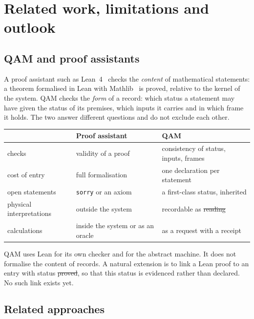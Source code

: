 \section{Related work, limitations and outlook}\label{sec:related}

\subsection{QAM and proof assistants}

A proof assistant such as Lean~4~\cite{lean4} checks the \emph{content} of mathematical statements: a theorem formalised in Lean with
Mathlib~\cite{mathlib} is proved, relative to the kernel of the system. QAM checks the \emph{form} of a record: which status a statement
may have given the status of its premises, which inputs it carries and in which frame it holds. The two answer different questions and do
not exclude each other.
\begin{center}
\small
\begin{tabular}{@{}p{}p{}p{}@{}}
\toprule
 & Proof assistant & QAM\\
\midrule
checks & validity of a proof & consistency of status, inputs, frames\\
cost of entry & full formalisation & one declaration per statement\\
open statements & \texttt{sorry} or an axiom & a first-class status, inherited\\
physical interpretations & outside the system & recordable as \st{reading}\\
calculations & inside the system or as an oracle & as a request with a receipt\\
\bottomrule
\end{tabular}
\end{center}
QAM uses Lean for its own checker and for the abstract machine. It does not formalise the content of records. A natural extension is to
link a Lean proof to an entry with status \st{proved}, so that this status is evidenced rather than declared. No such link exists yet.

\subsection{Related approaches}

